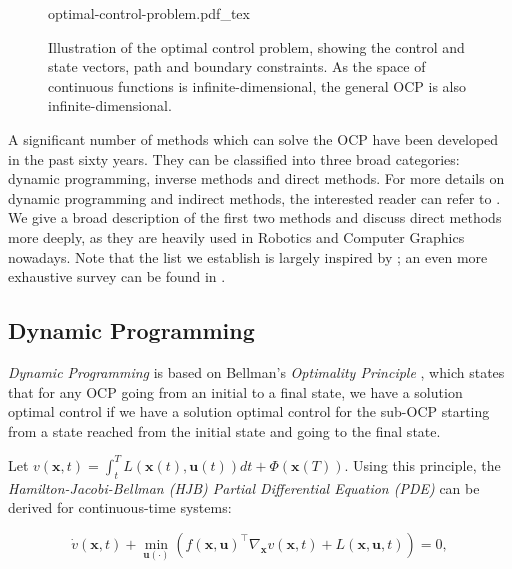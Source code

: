 \begin{figure}
  \centering
      {\def\svgwidth{0.9\linewidth}
        
                   {optimal-control-problem.pdf_tex}
      }
      \caption{Illustration of the optimal control problem, showing
        the control and state vectors, path and boundary
        constraints. As the space of continuous functions is
        infinite-dimensional, the general OCP is also
        infinite-dimensional.}
      \label{fig:chap3-optimal-control-problem}
\end{figure}

A significant number of methods which can solve the OCP have been
developed in the past sixty years. They can be classified into three
broad categories: dynamic programming, inverse methods and direct
methods. For more details on dynamic programming and indirect methods,
the interested reader can refer to \cite{laumond1998robot,
  todorov2006optimal}. We give a broad description of the first two
methods and discuss direct methods more deeply, as they are heavily
used in Robotics and Computer Graphics nowadays. Note that the list we
establish is largely inspired by \cite{diehl2006fast}; an even more
exhaustive survey can be found in
\cite{betts1998survey,betts2010practical}.

\subsection{Dynamic Programming}

\emph{Dynamic Programming} is based on Bellman's \emph{Optimality
  Principle} \cite{bellman1965dynamic}, which states that for any OCP
going from an initial to a final state, we have a solution optimal
control if we have a solution optimal control for the sub-OCP starting
from a state reached from the initial state and going to the final
state.

Let $v(\mathbf{x},t) = \int_{t}^{T}L (\mathbf{x}(t), \mathbf{u}(t))dt
+ \Phi(\mathbf{x}(T))$. Using this principle, the
\emph{Hamilton-Jacobi-Bellman (HJB) Partial Differential Equation
  (PDE)} can be derived \linebreak for continuous-time systems:

\begin{equation}
\label{eq:chap3-hjb}
\dot{v}(\mathbf{x},t) + \min_{\mathbf{u} (\cdot)}\left(f(\mathbf{x},
\mathbf{u})^{\top}\nabla_{\mathbf{x}} v(\mathbf{x},t) + L (\mathbf{x},
\mathbf{u},t)\right) = 0,
\end{equation}

